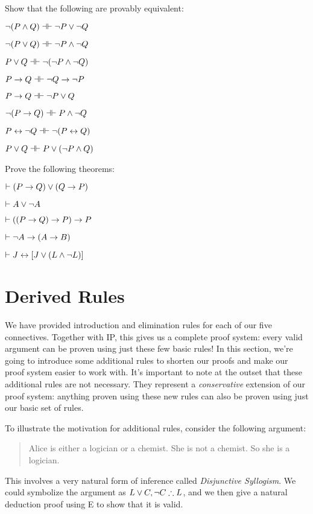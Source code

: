 \problempart
Show that the following are provably equivalent:
\begin{earg}
\item $\enot (P \eand Q) \pequiv \enot P \eor \enot Q$
\item $\enot (P \eor Q) \pequiv \enot P \eand \enot Q$
\item $P \eor Q \pequiv \enot (\enot P \eand \enot Q)$
\item $P \eif Q \pequiv \enot Q \eif \enot P$
\item $P \eif Q \pequiv \enot P \eor Q$
\item $\enot (P \eif Q) \pequiv P \eand \enot Q$
\item $P \eiff \enot Q \pequiv \enot(P \eiff Q)$
\item $P \eor Q \pequiv P \eor (\enot P \eand Q)$
\end{earg}

\problempart
Prove the following theorems:

\begin{earg}
\item $\vdash (P \rightarrow Q) \vee (Q \rightarrow P)$
\item $\vdash A \vee \neg A$ %
\item $\vdash ((P \rightarrow Q) \rightarrow P) \rightarrow P$ %
\item $\vdash \neg A \rightarrow (A \rightarrow B)$
\item $\vdash J \leftrightarrow [J\vee (L\wedge\neg L)]$
\end{earg}



\section{Derived Rules}\label{s:TFLDerivedRules}

We have provided introduction and elimination rules for each of our five connectives.  Together with IP, this gives us a complete proof system: every valid argument can be proven using just these few basic rules!  In this section, we're going to introduce some additional rules to shorten our proofs and make our proof system easier to work with.  It's important to note at the outset that these additional rules are not necessary.  They represent a \emph{conservative} extension of our proof system: anything proven using these new rules can also be proven using just our basic set of rules.

To illustrate the motivation for additional rules, consider the following argument:
	\begin{quote}
		Alice is either a logician or a chemist. She is not a chemist.  So she is a logician.
	\end{quote}
This involves a very natural form of inference called \emph{Disjunctive Syllogism}.  We could symbolize the argument as $L\vee C, \neg C \therefore L$, and we then give a natural deduction proof using \eor E to show that it is valid.

